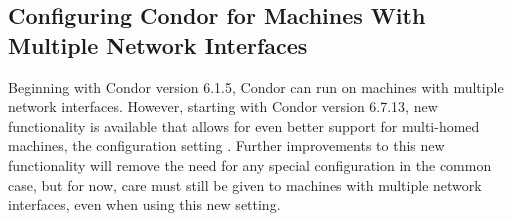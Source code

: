 \subsection{\label{sec:Multiple-Interfaces}Configuring Condor for
Machines With Multiple Network Interfaces } 


%
%
%
%


Beginning with Condor version 6.1.5, Condor can run on machines with
multiple network interfaces.
However, starting with Condor version 6.7.13, new functionality is
available that allows for even better support for multi-homed
machines, the configuration setting .
Further improvements to this new functionality will remove the need
for any special configuration in the common case, but for now, care
must still be given to machines with multiple network interfaces, even
when using this new setting.

